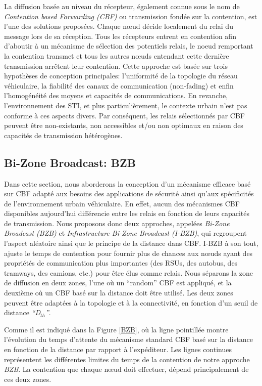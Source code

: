 La diffusion basée au niveau du récepteur, également connue sous le nom de {\em Contention based Forwarding (CBF)} \cite{cbf} ou transmission fondée sur la contention, est l'une des solutions proposées. Chaque nœud décide localement du relai du message lors de sa réception. Tous les récepteurs entrent en contention afin d'aboutir à un mécanisme de sélection des potentiels relais, le noeud remportant la contention transmet et tous les autres nœuds entendant cette dernière transmission arr\^etent leur contention. Cette approche est basée sur trois hypothèses de conception principales: l'uniformité de la topologie du réseau véhiculaire, la fiabilité des canaux de communication (non-fading) et enfin l'homogénéité des moyens et capacités de communications. En revanche, l'environnement des STI, et plus particulièrement, le contexte urbain n'est pas conforme à ces aspects divers. Par conséquent, les relais sélectionnés par CBF peuvent être non-existants, non accessibles et/ou non optimaux en raison des capacités de transmission hétérogènes.

\subsection{Bi-Zone Broadcast: BZB}
Dans cette section, nous aborderons la conception d'un mécanisme efficace basé sur CBF adapté aux besoins des applications de sécurité ainsi qu'aux spécificités de l'environnement urbain véhiculaire. En effet, aucun des mécanismes CBF disponibles aujourd'hui différencie entre les relais en fonction de leurs capacités de transmission. Nous proposons donc deux approches, appelées {\em Bi-Zone Broadcast (BZB)} et {\em Infrastructure Bi-Zone Broadcast (I-BZB)}, qui regroupent l'aspect aléatoire ainsi que le principe de la distance dans CBF. I-BZB à son tout, ajuste le temps de contention pour fournir plus de chances aux nœuds ayant des propriétés de communication plus importantes (des RSUs, des autobus, des tramways, des camions, etc.) pour être élus comme relais. Nous séparons la zone de diffusion en deux zones, l'une où un ``random'' CBF est appliqué, et la deuxième où un CBF basé sur la distance doit être utilisé. Les deux zones peuvent être adaptées à la topologie et à la connectivité, en fonction d'un seuil de distance \textit{``D$_{th}$''}.

Comme il est indiqué dans la Figure \ref{BZB}, où la ligne pointillée montre l'évolution du temps d'attente du mécanisme standard CBF basé sur la distance en fonction de la distance par rapport à l'expéditeur. Les lignes continues représentent les différentes limites du temps de la contention de notre approche \textit{BZB}. La contention que chaque nœud doit effectuer, dépend principalement de ces deux zones.

